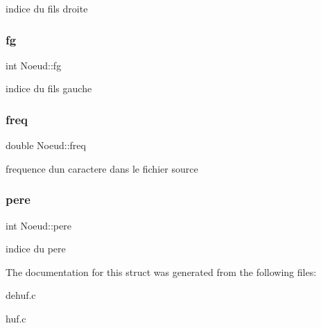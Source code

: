 indice du fils droite \mbox{\label{structNoeud_a2aeffae918ba8274b8b5f75706bb84de}} 
\subsubsection{\texorpdfstring{fg}{fg}}
{\footnotesize\ttfamily int Noeud\+::fg}

indice du fils gauche \mbox{\label{structNoeud_a2678aa0eb590d87e8b61d071c2d5b995}} 
\subsubsection{\texorpdfstring{freq}{freq}}
{\footnotesize\ttfamily double Noeud\+::freq}

frequence d\textquotesingle{}un caractere dans le fichier source \mbox{\label{structNoeud_a2ea9146a5bd3678a27f8a56c9306de22}} 
\subsubsection{\texorpdfstring{pere}{pere}}
{\footnotesize\ttfamily int Noeud\+::pere}

indice du pere 

The documentation for this struct was generated from the following files\+:\begin{DoxyCompactItemize}
\item 
dehuf.\+c\item 
huf.\+c\end{DoxyCompactItemize}
